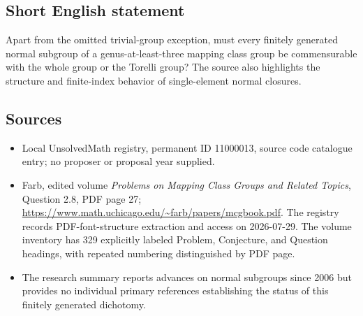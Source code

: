 \documentclass[11pt]{article}
\begin{document}
\subsection{Short English statement}
Apart from the omitted trivial-group exception, must every finitely generated normal subgroup of a genus-at-least-three mapping class group be commensurable with the whole group or the Torelli group? The source also highlights the structure and finite-index behavior of single-element normal closures.
\subsection{Sources}
\begin{itemize}
\item Local UnsolvedMath registry, permanent ID 11000013, source code catalogue entry; no proposer or proposal year supplied.
\item Farb, edited volume \emph{Problems on Mapping Class Groups and Related Topics}, Question 2.8, PDF page 27; \url{https://www.math.uchicago.edu/~farb/papers/mcgbook.pdf}. The registry records PDF-font-structure extraction and access on 2026-07-29. The volume inventory has 329 explicitly labeled Problem, Conjecture, and Question headings, with repeated numbering distinguished by PDF page.
\item The research summary reports advances on normal subgroups since 2006 but provides no individual primary references establishing the status of this finitely generated dichotomy.
\end{itemize}
\end{document}
